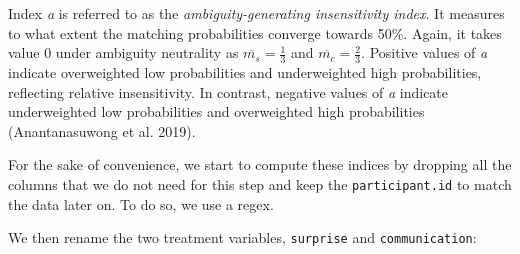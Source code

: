 \documentclass[
  a4paper,
  DIV=11,
  numbers=noendperiod]{scrreprt}
\begin{document}
Index \emph{a} is referred to as the \emph{ambiguity-generating
insensitivity index}. It measures to what extent the matching
probabilities converge towards 50\%. Again, it takes value 0 under
ambiguity neutrality as \(\overline{m_s} = \frac{1}{3}\) and
\(\overline{m_c} = \frac{2}{3}\). Positive values of \emph{a} indicate
overweighted low probabilities and underweighted high probabilities,
reflecting relative insensitivity. In contrast, negative values of
\emph{a} indicate underweighted low probabilities and overweighted high
probabilities (Anantanasuwong et al. 2019).

For the sake of convenience, we start to compute these indices by
dropping all the columns that we do not need for this step and keep the
\texttt{participant.id} to match the data later on. To do so, we use a
regex.

We then rename the two treatment variables, \texttt{surprise} and
\texttt{communication}:
\end{document}
